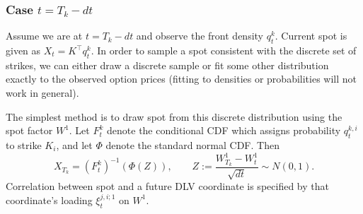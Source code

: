\documentclass[11pt]{article}
\theoremstyle{plain}
\theoremstyle{definition}
\theoremstyle{remark}
\begin{document}
\subsubsection*{Case $t=T_k-dt$}

Assume we are at $t=T_k-dt$ and observe the front density $q_{t}^k$. Current spot is given as $X_t = K^\top q_t^k$.
In order to sample a spot consistent with the discrete set of strikes, we can either draw a discrete sample or fit some other distribution exactly to the observed option prices (fitting to densities or probabilities will not work in general).

The simplest method is to draw spot from this discrete distribution using
the spot factor $W^1$. Let $F_t^k$ denote the conditional CDF which assigns
probability $q_t^{k,i}$ to strike $K_i$, and let $\Phi$ denote the standard
normal CDF. Then
\[
X_{T_k}=(F_t^k)^{-1}\!\left(\Phi(Z)\right),
\qquad
Z:=\frac{W_{T_k}^1-W_t^1}{\sqrt{dt}}\sim N(0,1).
\]
Correlation between spot and a future DLV coordinate is specified by that
coordinate's loading $\xi_t^{j,i;1}$ on $W^1$.
\end{document}
